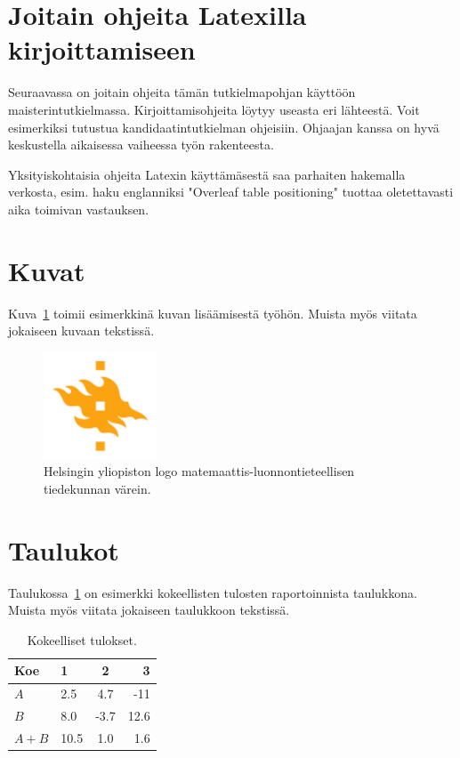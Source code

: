\section{Joitain ohjeita Latexilla kirjoittamiseen}

Seuraavassa on joitain ohjeita tämän tutkielmapohjan käyttöön maisterintutkielmassa. Kirjoittamisohjeita löytyy useasta eri lähteestä. Voit esimerkiksi tutustua kandidaatintutkielman ohjeisiin. 
Ohjaajan kanssa on hyvä keskustella aikaisessa vaiheessa työn rakenteesta.

Yksityiskohtaisia ohjeita Latexin käyttämäsestä saa parhaiten hakemalla verkosta, esim. haku englanniksi "Overleaf table positioning" tuottaa oletettavasti aika toimivan vastauksen.

\section{Kuvat}
Kuva~\ref{fig:logo-fi} toimii esimerkkinä kuvan lisäämisestä työhön. Muista myös viitata jokaiseen kuvaan tekstissä. 

\begin{figure}[ht] %
\centering 
\includegraphics[width=0.3\textwidth]{template/figures/HY-logo-ml.png}
\caption{Helsingin yliopiston logo matemaattis-luonnontieteellisen tiedekunnan värein.\label{fig:logo-fi}}
\end{figure}

\newpage %
\section{Taulukot}

Taulukossa~\ref{table:results-fi} on esimerkki kokeellisten tulosten raportoinnista taulukkona. Muista myös viitata jokaiseen taulukkoon tekstissä.
\begin{table}[ht]
\centering
\caption{Kokeelliset tulokset.\label{table:results-fi}}
\begin{tabular}{l||l c r} 
Koe & 1 & 2 & 3 \\ 
\hline \hline 
$A$ & 2.5 & 4.7 & -11 \\
$B$ & 8.0 & -3.7 & 12.6 \\
$A+B$ & 10.5 & 1.0 & 1.6 \\
\hline
%
\end{tabular}
\end{table}

